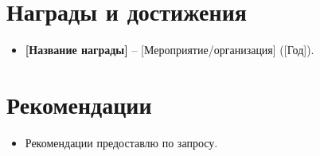 \documentclass[11pt,a4paper,sans]{moderncv}
\begin{document}
\section{Награды и достижения}
\vspace{1pt}
\begin{itemize}
\item{\textbf{[Название награды]} -- [Мероприятие/организация] ([Год]).}
\end{itemize}


\section{Рекомендации}
\vspace{1pt}
\begin{itemize}
\item{Рекомендации предоставлю по запросу.}
\end{itemize}
\end{document}
